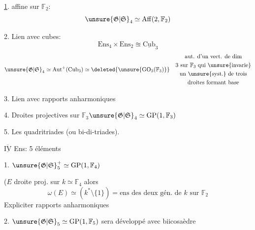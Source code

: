 \uline{1}.   affine sur $\mathbb F_2$:
\[
\unsure{\mathfrak G|\mathfrak S}_4\simeq\operatorname{Aff}(2,\mathbb F_2)
\]

2. Lien avec cubes:
\[
\mathrm{Ens}_4\times\mathrm{Ens}_2\approxeq\underline{\mathrm{Cub}}_3
\]
\[
\unsure{\mathfrak G|\mathfrak S}_4\simeq\operatorname{Aut}^+(\mathrm{Cub}_3)\simeq\deleted{\unsure{\mathrm{GO}_3(\mathbb F_3)}}\quad\begin{gathered}
\text{aut. d'un vect. de dim}\\
\text{3 sur }\mathbb F_3\text{ qui \unsure{invarie}}\\
\text{un \unsure{syst.} de trois}\\
\text{droites formant base}
\end{gathered}
\]

3. Lien avec rapports anharmoniques

4. Droites projectives sur $\mathbb F_3$\quad $\unsure{\mathfrak G|\mathfrak S}_4\simeq\mathrm{GP}(1,\mathbb F_3)$

5. Les quadritriades (ou bi-di-triades).


$\overline{\underline{\mathrm{IV}}}$ Ens: 5 éléments


1. $\unsure{\mathfrak G|\mathfrak S}_5^+\simeq\mathrm{GP}(1,\mathbb F_4)$


 ($E$ droite proj. sur $k\simeq\mathbb F_4$ alors
\[
\omega(E)\simeq(k^*\setminus\{1\})=\text{ens des deux gén. de }k\text{ sur }\mathbb F_2
\]
Expliciter rapports anharmoniques

2. $\unsure{\mathfrak G|\mathfrak S}_5\simeq\mathrm{GP}(1,\mathbb F_5)$ sera développé avec  biicosaèdre
